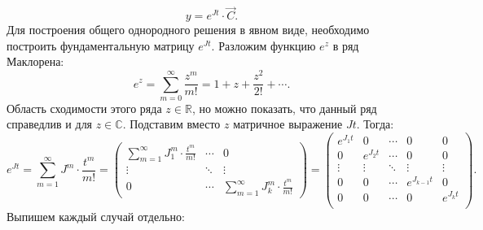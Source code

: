 	\[ y = e^{Jt} \cdot \vec{C}. \]
	Для построения общего однородного решения в явном виде, необходимо построить фундаментальную матрицу $e^{Jt}$. Разложим функцию $e^{z}$ в ряд Маклорена:
	\[ e^{z} = \sum_{m = 0}^{\infty} \frac{z^m}{m!} = 1 + z + \frac{z^2}{2!} + \cdots. \]
	Область сходимости этого ряда $z \in \mathbb{R}$, но можно показать, что данный ряд справедлив и для $z \in \mathbb{C}$. Подставим вместо $z$ матричное выражение $Jt$. Тогда:
	\[ e^{Jt} = \sum_{m = 1}^{\infty} J^m \cdot \frac{t^m}{m!} = \begin{pmatrix} 
		\sum\limits_{m = 1}^{\infty} J^m_1 \cdot \frac{t^m}{m!} & \cdots & 0 \\ 
		\vdots & \ddots & \vdots \\
		0 & \cdots & \sum\limits_{m = 1}^{\infty} J^m_k \cdot \frac{t^m}{m!}
	\end{pmatrix} = \begin{pmatrix} 
		e^{J_1 t} & 0 & \cdots & 0 & 0 \\
		0 & e^{J_2 t} & \cdots & 0 & 0 \\
		\vdots & \vdots & \ddots & \vdots & \vdots \\
		0 & 0 & \cdots & e^{J_{k-1} t} & 0 \\
		0 & 0 & \cdots & 0 & e^{J_k t} \\
	\end{pmatrix}. \]
	Выпишем каждый случай отдельно:
